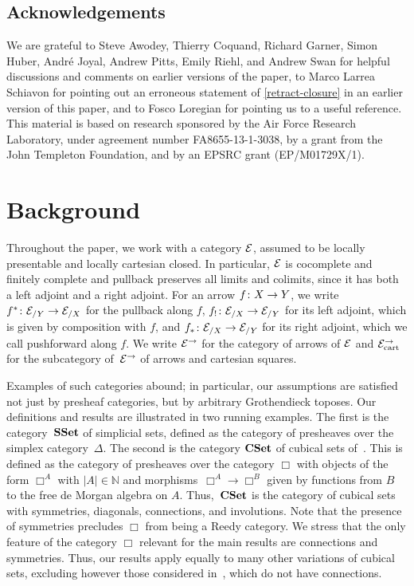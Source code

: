 \documentclass[reqno,10pt,a4paper,oneside,draft]{amsart}
\begin{document}
\subsection*{Acknowledgements}

We are grateful to Steve Awodey, Thierry Coquand, Richard Garner, Simon Huber, Andr\'e Joyal, Andrew Pitts, Emily Riehl, and Andrew Swan for helpful discussions and comments on earlier versions of the paper, to Marco Larrea Schiavon for pointing out an erroneous statement of \cref{retract-closure} in an earlier version of this paper, and to Fosco Loregian for pointing us to a useful reference.
This material is based on research sponsored by the Air Force Research Laboratory, under agreement number FA8655-13-1-3038, by a grant from the John Templeton Foundation, and by an EPSRC grant (EP/M01729X/1).

\section{Background}
\label{sec:bac}

Throughout the paper, we work with a category $\cal{E}$, assumed to be locally presentable and locally cartesian closed.
In particular, $\catE$ is cocomplete and finitely complete and pullback preserves all limits and colimits, since it has both a left adjoint and a right adjoint.
For an arrow $f \co X \to Y$, we write $f^* \co \cal{E}_{/Y} \to \cal{E}_{/X}$ for the pullback along $f$, $f_{!} \co \cal{E}_{/X} \to \cal{E}_{/Y}$ for its left adjoint, which is given by composition with $f$, and $f_* \co \cal{E}_{/X} \to \cal{E}_{/Y}$ for its right adjoint, which we call pushforward along $f$.
We write $\cal{E}^\to$ for the category of arrows of $\cal{E}$ and $\cal{E}^\to_{\mathrm{cart}}$ for the subcategory of~$\cal{E}^\to$ of arrows and cartesian squares.

Examples of such categories abound; in particular, our assumptions are satisfied not just by presheaf categories, but by arbitrary Grothendieck toposes.
Our definitions and results are illustrated in two running examples.
The first is the category~$\SSet$ of simplicial sets, defined as the category of presheaves over the simplex category~$\Delta$.
The second is the category $\CSet$ of cubical sets of~\cite{cohen-et-al:cubicaltt}.
This is defined as the category of presheaves over the category $\Box$ with objects of the form $\Box^A$ with $|A| \in \mathbb{N}$ and morphisms~$\Box^A \to \Box^B$ given by functions from $B$ to the free de Morgan algebra on $A$.
Thus,~$\CSet$ is the category of cubical sets with symmetries, diagonals, connections, and involutions.
Note that the presence of symmetries precludes $\Box$ from being a Reedy category.
We stress that the only feature of the category $\Box$ relevant for the main results are connections and symmetries.
Thus, our results apply equally to many other variations of cubical sets, excluding however those considered in~\cite{coquand-cubical-sets,huber-thesis}, which do not have connections.
\end{document}
